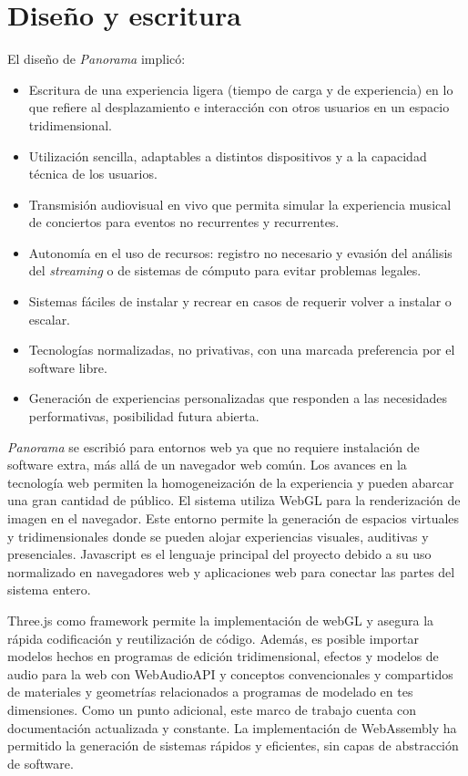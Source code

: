 \section*{Diseño y escritura} %

El diseño de \textit{Panorama} implicó:

\begin{itemize}
\item Escritura de una experiencia ligera (tiempo de carga y de experiencia) en lo que refiere al desplazamiento e interacción con otros usuarios en un espacio tridimensional. 
\item Utilización sencilla, adaptables a distintos dispositivos y a la capacidad técnica de los usuarios.
\item Transmisión audiovisual en vivo que permita simular la experiencia musical de conciertos para eventos no recurrentes y recurrentes. 
\item Autonomía en el uso de recursos: registro no necesario y evasión del análisis del \textit{streaming} o de sistemas de cómputo para evitar problemas legales. 
\item Sistemas fáciles de instalar y recrear en casos de requerir volver a instalar o escalar.
\item Tecnologías normalizadas, no privativas, con una marcada preferencia por el software libre.
\item Generación de experiencias personalizadas que responden a las necesidades performativas, posibilidad futura abierta. 
\end{itemize}

\textit{Panorama} se escribió para entornos web ya que no requiere instalación de software extra, más allá de un navegador web común. Los avances en la tecnología web permiten la homogeneización de la experiencia y pueden abarcar una gran cantidad de público. El sistema utiliza WebGL para la renderización de imagen en el navegador. Este entorno permite la generación de espacios virtuales y tridimensionales donde se pueden alojar experiencias visuales, auditivas y presenciales. Javascript es el lenguaje principal del proyecto debido a su uso normalizado en navegadores web y aplicaciones web para conectar las partes del sistema entero.

Three.js como framework permite la implementación de webGL y asegura la rápida codificación y reutilización de código. Además, es posible importar modelos hechos en programas de edición tridimensional, efectos y modelos de audio para la web con WebAudioAPI y conceptos convencionales y compartidos de materiales y geometrías relacionados a programas de modelado en tes dimensiones. Como un punto adicional, este marco de trabajo cuenta con documentación actualizada y constante. La implementación de WebAssembly ha permitido la generación de sistemas rápidos y eficientes, sin capas de abstracción de software.

